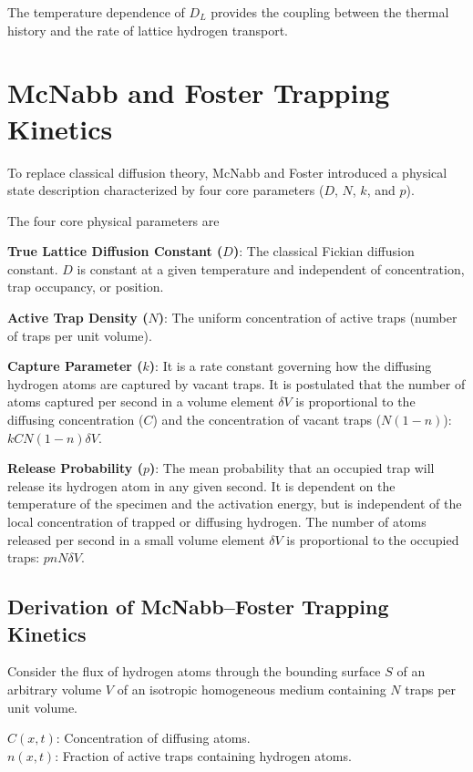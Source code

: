 \documentclass[a4paper,12pt,oneside]{report}
\begin{document}
The temperature dependence of $D_L$ provides the coupling between the thermal history and the rate of lattice hydrogen transport.

\section{McNabb and Foster Trapping Kinetics}

To replace classical diffusion theory, McNabb and Foster \cite{McNabb1963} introduced a physical state description characterized by four core parameters ($D$, $N$, $k$, and $p$).

The four core physical parameters are

\textbf{True Lattice Diffusion Constant ($D$)}: The classical Fickian diffusion constant. $D$ is constant at a given temperature and independent of concentration, trap occupancy, or position.

\textbf{Active Trap Density ($N$)}: The uniform concentration of active traps (number of traps per unit volume).

\textbf{Capture Parameter ($k$)}: It is a rate constant governing how the diffusing hydrogen atoms are captured by vacant traps.
It is postulated that the number of atoms captured per second in a volume element $\delta V$ is proportional to the diffusing concentration ($C$) and the concentration of vacant traps ($N(1 - n)$): $kCN(1 - n)\delta V$.

\textbf{Release Probability ($p$)}: The mean probability that an occupied trap will release its hydrogen atom in any given second. It is dependent on the temperature of the specimen and the activation energy, but is independent of the local concentration of trapped or diffusing hydrogen.
The number of atoms released per second in a small volume element $\delta V$ is proportional to the occupied traps: $pnN\delta V$.

\subsection{Derivation of McNabb--Foster Trapping Kinetics}

Consider the flux of hydrogen atoms through the bounding surface $S$ of an arbitrary volume $V$ of an isotropic homogeneous medium containing $N$ traps per unit volume.

$C(x, t)$: Concentration of diffusing atoms. \\
$n(x, t)$: Fraction of active traps containing hydrogen atoms.
\end{document}
